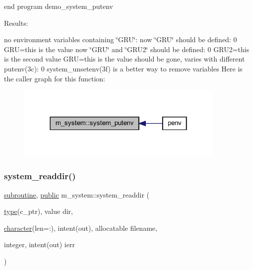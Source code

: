 end program demo\+\_\+system\+\_\+putenv

Results\+:

no environment variables containing \char`\"{}\+G\+R\+U\char`\"{}\+: now \char`\"{}\+G\+R\+U\char`\"{} should be defined\+: 0 G\+RU=this is the value now \char`\"{}\+G\+R\+U\char`\"{} and \char`\"{}\+G\+R\+U2\char`\"{} should be defined\+: 0 G\+R\+U2=this is the second value G\+RU=this is the value should be gone, varies with different putenv(3c)\+: 0 system\+\_\+unsetenv(3f) is a better way to remove variables Here is the caller graph for this function\+:
\nopagebreak
\begin{figure}[H]
\begin{center}
\leavevmode
\includegraphics[width=286pt]{namespacem__system_af0c9df8e59cac9cd617cd1e20448ea7d_icgraph}
\end{center}
\end{figure}
\mbox{\label{namespacem__system_a983df5b2d7cb5842d69c4a31829403e0}} 
\subsubsection{\texorpdfstring{system\+\_\+readdir()}{system\_readdir()}}
{\footnotesize\ttfamily \hyperlink{M__stopwatch_83_8txt_acfbcff50169d691ff02d4a123ed70482}{subroutine}, \hyperlink{M__stopwatch_83_8txt_a2f74811300c361e53b430611a7d1769f}{public} m\+\_\+system\+::system\+\_\+readdir (\begin{DoxyParamCaption}\item[{\hyperlink{stop__watch_83_8txt_a70f0ead91c32e25323c03265aa302c1c}{type}(c\+\_\+ptr), value}]{dir,  }\item[{\hyperlink{option__stopwatch_83_8txt_abd4b21fbbd175834027b5224bfe97e66}{character}(len=\+:), intent(out), allocatable}]{filename,  }\item[{integer, intent(out)}]{ierr }\end{DoxyParamCaption})}



